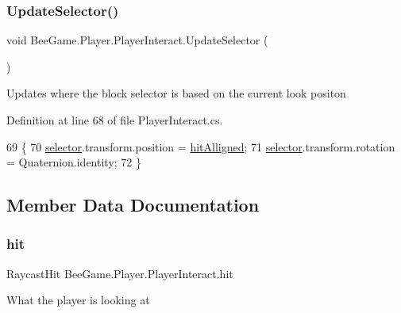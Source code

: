 \subsubsection{\texorpdfstring{Update\+Selector()}{UpdateSelector()}}
{\footnotesize\ttfamily void Bee\+Game.\+Player.\+Player\+Interact.\+Update\+Selector (\begin{DoxyParamCaption}{ }\end{DoxyParamCaption})\hspace{0.3cm}{\ttfamily [private]}}



Updates where the block selector is based on the current look positon 



Definition at line 68 of file Player\+Interact.\+cs.


\begin{DoxyCode}
69         \{
70             \hyperlink{class_bee_game_1_1_player_1_1_player_interact_ae6cde5e9d6378a1d750e442fecc9595e}{selector}.transform.position = \hyperlink{class_bee_game_1_1_player_1_1_player_interact_ad7b39d8900f206f680945437ff3259a8}{hitAlligned};
71             \hyperlink{class_bee_game_1_1_player_1_1_player_interact_ae6cde5e9d6378a1d750e442fecc9595e}{selector}.transform.rotation = Quaternion.identity;
72         \}
\end{DoxyCode}


\subsection{Member Data Documentation}
\mbox{\label{class_bee_game_1_1_player_1_1_player_interact_a39537118b4601a3596122f124b684024}} 
\subsubsection{\texorpdfstring{hit}{hit}}
{\footnotesize\ttfamily Raycast\+Hit Bee\+Game.\+Player.\+Player\+Interact.\+hit\hspace{0.3cm}{\ttfamily [private]}}



What the player is looking at 



